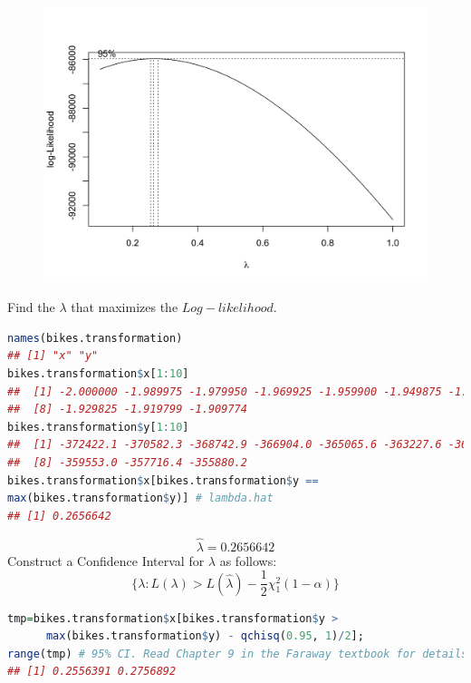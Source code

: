 \documentclass[11pt,a4paper]{article}
\begin{document}
\begin{center}\begin{figure}[htbp]
  \centering
  \includegraphics[scale=0.2]{d7}
  \caption{}
  \label{}
\end{figure}\end{center}
Find the $\lambda$ that maximizes the $Log-likelihood$.
\begin{lstlisting}[language=R]
names(bikes.transformation)
## [1] "x" "y"
bikes.transformation$x[1:10]
##  [1] -2.000000 -1.989975 -1.979950 -1.969925 -1.959900 -1.949875 -1.939850
##  [8] -1.929825 -1.919799 -1.909774
bikes.transformation$y[1:10]
##  [1] -372422.1 -370582.3 -368742.9 -366904.0 -365065.6 -363227.6 -361390.0
##  [8] -359553.0 -357716.4 -355880.2
bikes.transformation$x[bikes.transformation$y == 
max(bikes.transformation$y)] # lambda.hat
## [1] 0.2656642
\end{lstlisting}
$$\hat{\lambda}=0.2656642$$
Construct a Conﬁdence Interval for $\lambda$ as follows:
$$\{\lambda: L(\lambda)>L(\hat{\lambda})-\frac{1}{2}\chi_1^2(1-\alpha)  \}$$
\begin{lstlisting}[language=R]
tmp=bikes.transformation$x[bikes.transformation$y > 
      max(bikes.transformation$y) - qchisq(0.95, 1)/2];
range(tmp) # 95% CI. Read Chapter 9 in the Faraway textbook for details.
## [1] 0.2556391 0.2756892
\end{lstlisting}
\end{document}
